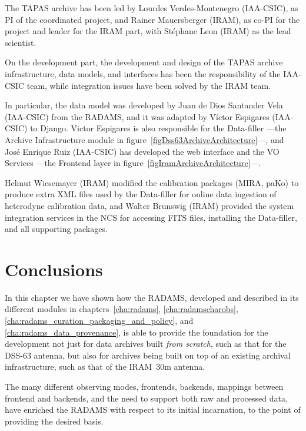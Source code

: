 			The TAPAS archive has been led by Lourdes
			Verdes-Montenegro (IAA-CSIC), as PI of the coordinated
			project, and Rainer Mauersberger (IRAM), as co-PI for
			the project and leader for the IRAM part, with
			Stéphane Leon (IRAM) as the lead scientist.
			
			On the development part, the development and design
			of the TAPAS archive infrastructure, data models, and
			interfaces has been the responsibility of the IAA-CSIC
			team, while integration issues have been solved by the
			IRAM team.
			
			In particular, the data model was developed by Juan de
			Dios Santander Vela (IAA-CSIC) from the RADAMS, and it
			was adapted by Víctor Espigares (IAA-CSIC) to Django.
			Victor Espigares is also responsible for the
			Data-filler ---the Archive Infrastructure module in
			figure~\ref{figDss63ArchiveArchitecture}---, and José
			Enrique Ruiz (IAA-CSIC) has developed the web interface
			and the VO Services ---the Frontend layer in
			figure~\ref{figIramArchiveArchitecture}---.
			
			Helmut Wiesemayer (IRAM) modified the calibration
			packages (MIRA, paKo) to produce extra XML files used by
			the Data-filler for online data ingestion of
			heterodyne calibration data, and Walter
			Brunswig (IRAM) provided the system integration
			services in the NCS for accessing
			FITS files, installing the Data-filler, and all
			supporting packages.

		
		
	
	\section{Conclusions} %
	\label{sec:radams_impl_conclusions}
		
		In this chapter we have shown how the RADAMS, developed
		and described in its different modules in
		chapters~\ref{cha:radams}, \ref{cha:radamscharobs},
		\ref{cha:radams_curation_packaging_and_policy}, and
		\ref{cha:radams_data_provenance}, is able to provide the
		foundation for the development not just for data archives
		built \emph{from  scratch}, such as that for the DSS-63
		antenna, but also for archives being built on top of an
		existing archival infrastructure, such as that of the
		IRAM~30m antenna.
		
		The many different observing modes, frontends, backends,
		mappings between frontend and backends, and the need to
		support both raw and processed data, have enriched the
		RADAMS with respect to its initial incarnation, to the
		point of providing the desired basis.
		
